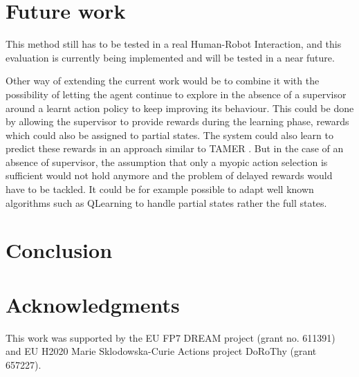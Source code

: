\documentclass[letterpaper]{article} %
\begin{document}
\section{Future work}

This method still has to be tested in a real Human-Robot Interaction, and this
evaluation is currently being implemented and will be tested in a near future.

Other way of extending the current work would be to combine it with the
possibility of letting the agent continue to explore in the absence of a
supervisor around a learnt action policy to keep improving its behaviour. This
could be done by allowing the supervisor to provide rewards during the learning
phase, rewards which could also be assigned to partial states. The system could
also learn to predict these rewards in an approach similar to TAMER 
\cite{knox2009interactively}. But in the case of an absence of supervisor, the assumption that only a
myopic action selection is sufficient would not hold anymore and the problem of
delayed rewards would have to be tackled. It could be for example possible to
adapt well known algorithms such as QLearning to handle partial states rather
the full states.

\section{Conclusion}
\label{sec:conclusion}
\section{Acknowledgments}
This work was supported by the EU FP7 DREAM project (grant no.  611391) and EU
H2020 Marie Sklodowska-Curie Actions project DoRoThy (grant 657227).  

 
\end{document}
